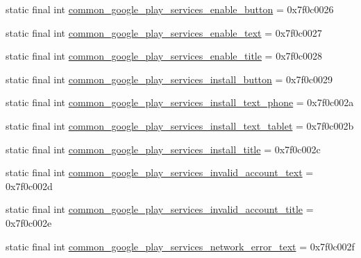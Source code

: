 \begin{DoxyCompactItemize}
\item 
static final int \mbox{\hyperlink{classcom_1_1google_1_1android_1_1gms_1_1R_1_1string_ab0adbb2deb8a19ef7589a72dab8a4948}{common\+\_\+google\+\_\+play\+\_\+services\+\_\+enable\+\_\+button}} = 0x7f0c0026
\item 
static final int \mbox{\hyperlink{classcom_1_1google_1_1android_1_1gms_1_1R_1_1string_acf43eb6ce78ade04686881716f0b5316}{common\+\_\+google\+\_\+play\+\_\+services\+\_\+enable\+\_\+text}} = 0x7f0c0027
\item 
static final int \mbox{\hyperlink{classcom_1_1google_1_1android_1_1gms_1_1R_1_1string_a5710a6149bb049a4e4bcceb2c346c610}{common\+\_\+google\+\_\+play\+\_\+services\+\_\+enable\+\_\+title}} = 0x7f0c0028
\item 
static final int \mbox{\hyperlink{classcom_1_1google_1_1android_1_1gms_1_1R_1_1string_a7a7b5d161a63d7fc9d4778b964048ffd}{common\+\_\+google\+\_\+play\+\_\+services\+\_\+install\+\_\+button}} = 0x7f0c0029
\item 
static final int \mbox{\hyperlink{classcom_1_1google_1_1android_1_1gms_1_1R_1_1string_a1f84556782ee41161779be9f685fe230}{common\+\_\+google\+\_\+play\+\_\+services\+\_\+install\+\_\+text\+\_\+phone}} = 0x7f0c002a
\item 
static final int \mbox{\hyperlink{classcom_1_1google_1_1android_1_1gms_1_1R_1_1string_a9e52d93aa6dacb67018c83ff1199adce}{common\+\_\+google\+\_\+play\+\_\+services\+\_\+install\+\_\+text\+\_\+tablet}} = 0x7f0c002b
\item 
static final int \mbox{\hyperlink{classcom_1_1google_1_1android_1_1gms_1_1R_1_1string_a4efd45e6436c8ab703b88bc3bdc1754e}{common\+\_\+google\+\_\+play\+\_\+services\+\_\+install\+\_\+title}} = 0x7f0c002c
\item 
static final int \mbox{\hyperlink{classcom_1_1google_1_1android_1_1gms_1_1R_1_1string_a5c1a4c670056121040996dc03333148e}{common\+\_\+google\+\_\+play\+\_\+services\+\_\+invalid\+\_\+account\+\_\+text}} = 0x7f0c002d
\item 
static final int \mbox{\hyperlink{classcom_1_1google_1_1android_1_1gms_1_1R_1_1string_a671c697b2dd41ced6b1f08f258f619f3}{common\+\_\+google\+\_\+play\+\_\+services\+\_\+invalid\+\_\+account\+\_\+title}} = 0x7f0c002e
\item 
static final int \mbox{\hyperlink{classcom_1_1google_1_1android_1_1gms_1_1R_1_1string_a9bfafea818c54ef611cfbaf6d67c208f}{common\+\_\+google\+\_\+play\+\_\+services\+\_\+network\+\_\+error\+\_\+text}} = 0x7f0c002f
\item 

\end{DoxyCompactItemize}
